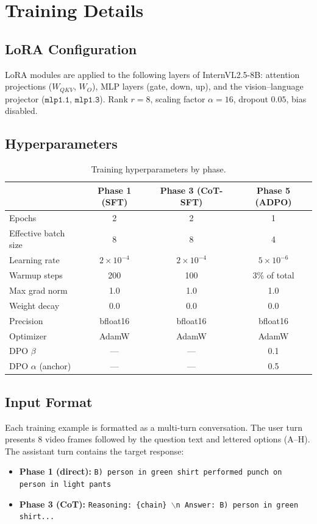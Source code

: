 \section{Training Details}
\label{app:training}

\subsection{LoRA Configuration}

LoRA modules are applied to the following layers of InternVL2.5-8B:
attention projections ($W_{QKV}$, $W_O$), MLP layers (gate, down, up),
and the vision--language projector ($\texttt{mlp1.1}$, $\texttt{mlp1.3}$).
Rank $r = 8$, scaling factor $\alpha = 16$, dropout $0.05$, bias disabled.

\subsection{Hyperparameters}

\begin{table}[h]
\centering
\small
\caption{Training hyperparameters by phase.}
\begin{tabular}{lccc}
\toprule
 & Phase 1 (SFT) & Phase 3 (CoT-SFT) & Phase 5 (ADPO) \\
\midrule
Epochs & 2 & 2 & 1 \\
Effective batch size & 8 & 8 & 4 \\
Learning rate & $2 \times 10^{-4}$ & $2 \times 10^{-4}$ & $5 \times 10^{-6}$ \\
Warmup steps & 200 & 100 & 3\% of total \\
Max grad norm & 1.0 & 1.0 & 1.0 \\
Weight decay & 0.0 & 0.0 & 0.0 \\
Precision & bfloat16 & bfloat16 & bfloat16 \\
Optimizer & AdamW & AdamW & AdamW \\
\midrule
DPO $\beta$ & --- & --- & 0.1 \\
DPO $\alpha$ (anchor) & --- & --- & 0.5 \\
\bottomrule
\end{tabular}
\end{table}

\subsection{Input Format}

Each training example is formatted as a multi-turn conversation.
The user turn presents 8 video frames followed by the question text and
lettered options (A--H).
The assistant turn contains the target response:
\begin{itemize}
  \item \textbf{Phase 1 (direct):} \texttt{B) person in green shirt performed punch on person in light pants}
  \item \textbf{Phase 3 (CoT):} \texttt{Reasoning: \{chain\} $\backslash$n Answer: B) person in green shirt...}
\end{itemize}

